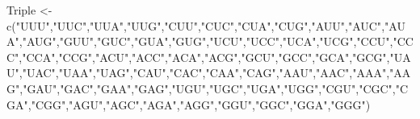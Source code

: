 \documentclass[
]{article}
\newenvironment{Shaded}{\begin{snugshade}}{\end{snugshade}}
\newcommand{\FunctionTok}[1]{\textcolor[rgb]{0.00,0.00,0.00}{#1}}
\newcommand{\NormalTok}[1]{#1}
\newcommand{\OtherTok}[1]{\textcolor[rgb]{0.56,0.35,0.01}{#1}}
\newcommand{\StringTok}[1]{\textcolor[rgb]{0.31,0.60,0.02}{#1}}
\begin{document}
\begin{Shaded}
\begin{Highlighting}[]
\NormalTok{Triple }\OtherTok{\textless{}{-}} \FunctionTok{c}\NormalTok{(}\StringTok{"UUU"}\NormalTok{,}\StringTok{"UUC"}\NormalTok{,}\StringTok{"UUA"}\NormalTok{,}\StringTok{"UUG"}\NormalTok{,}\StringTok{"CUU"}\NormalTok{,}\StringTok{"CUC"}\NormalTok{,}\StringTok{"CUA"}\NormalTok{,}\StringTok{"CUG"}\NormalTok{,}\StringTok{"AUU"}\NormalTok{,}\StringTok{"AUC"}\NormalTok{,}\StringTok{"AUA"}\NormalTok{,}\StringTok{"AUG"}\NormalTok{,}\StringTok{"GUU"}\NormalTok{,}\StringTok{"GUC"}\NormalTok{,}\StringTok{"GUA"}\NormalTok{,}\StringTok{"GUG"}\NormalTok{,}\StringTok{"UCU"}\NormalTok{,}\StringTok{"UCC"}\NormalTok{,}\StringTok{"UCA"}\NormalTok{,}\StringTok{"UCG"}\NormalTok{,}\StringTok{"CCU"}\NormalTok{,}\StringTok{"CCC"}\NormalTok{,}\StringTok{"CCA"}\NormalTok{,}\StringTok{"CCG"}\NormalTok{,}\StringTok{"ACU"}\NormalTok{,}\StringTok{"ACC"}\NormalTok{,}\StringTok{"ACA"}\NormalTok{,}\StringTok{"ACG"}\NormalTok{,}\StringTok{"GCU"}\NormalTok{,}\StringTok{"GCC"}\NormalTok{,}\StringTok{"GCA"}\NormalTok{,}\StringTok{"GCG"}\NormalTok{,}\StringTok{"UAU"}\NormalTok{,}\StringTok{"UAC"}\NormalTok{,}\StringTok{"UAA"}\NormalTok{,}\StringTok{"UAG"}\NormalTok{,}\StringTok{"CAU"}\NormalTok{,}\StringTok{"CAC"}\NormalTok{,}\StringTok{"CAA"}\NormalTok{,}\StringTok{"CAG"}\NormalTok{,}\StringTok{"AAU"}\NormalTok{,}\StringTok{"AAC"}\NormalTok{,}\StringTok{"AAA"}\NormalTok{,}\StringTok{"AAG"}\NormalTok{,}\StringTok{"GAU"}\NormalTok{,}\StringTok{"GAC"}\NormalTok{,}\StringTok{"GAA"}\NormalTok{,}\StringTok{"GAG"}\NormalTok{,}\StringTok{"UGU"}\NormalTok{,}\StringTok{"UGC"}\NormalTok{,}\StringTok{"UGA"}\NormalTok{,}\StringTok{"UGG"}\NormalTok{,}\StringTok{"CGU"}\NormalTok{,}\StringTok{"CGC"}\NormalTok{,}\StringTok{"CGA"}\NormalTok{,}\StringTok{"CGG"}\NormalTok{,}\StringTok{"AGU"}\NormalTok{,}\StringTok{"AGC"}\NormalTok{,}\StringTok{"AGA"}\NormalTok{,}\StringTok{"AGG"}\NormalTok{,}\StringTok{"GGU"}\NormalTok{,}\StringTok{"GGC"}\NormalTok{,}\StringTok{"GGA"}\NormalTok{,}\StringTok{"GGG"}\NormalTok{)}

\end{Highlighting}
\end{Shaded}
\end{document}
